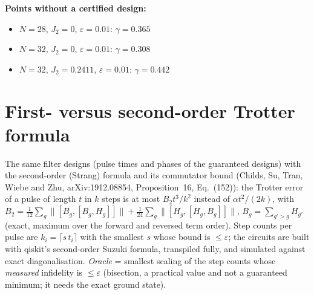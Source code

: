 \documentclass[11pt]{article}
\begin{document}
\textbf{Points without a certified design:}
\begin{itemize}
\item $N=28$, $J_2=0$, $\varepsilon=0.01$: $\gamma=0.365$
\item $N=32$, $J_2=0$, $\varepsilon=0.01$: $\gamma=0.308$
\item $N=32$, $J_2=0.2411$, $\varepsilon=0.01$: $\gamma=0.442$
\end{itemize}



\section{First- versus second-order Trotter formula}\label{sec:second}
The same filter designs (pulse times and phases of the guaranteed designs) with the second-order (Strang) formula and its commutator bound (Childs, Su, Tran, Wiebe and Zhu, arXiv:1912.08854, Proposition~16, Eq.~(152)): the Trotter error of a pulse of length $t$ in $k$ steps is at most $B_2t^3/k^2$ instead of $\alpha t^2/(2k)$, with $B_2=\tfrac1{12}\sum_g\|[B_g,[B_g,H_g]]\|+\tfrac1{24}\sum_g\|[H_g,[H_g,B_g]]\|$, $B_g=\sum_{g'>g}H_{g'}$ (exact, maximum over the forward and reversed term order). Step counts per pulse are $k_i=\lceil s\,t_i\rceil$ with the smallest $s$ whose bound is $\leq\varepsilon$; the circuits are built with qiskit's second-order Suzuki formula, transpiled fully, and simulated against exact diagonalisation. \emph{Oracle} = smallest scaling of the step counts whose \emph{measured} infidelity is $\leq\varepsilon$ (bisection, a practical value and not a guaranteed minimum; it needs the exact ground state).
\end{document}
